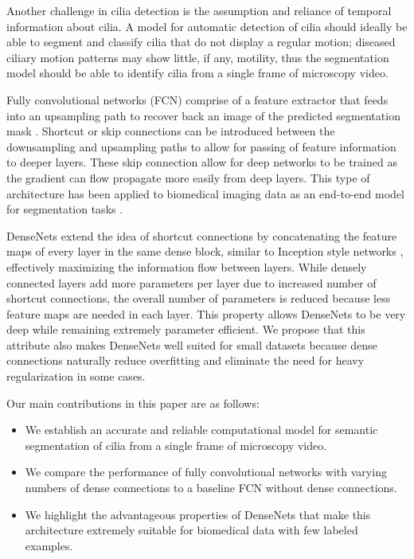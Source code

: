 \documentclass{llncs}
\begin{document}
\par
Another challenge in cilia detection is the assumption and reliance of temporal information about cilia. A model for automatic detection of cilia should ideally be able to segment and classify cilia that do not display a regular motion; diseased ciliary motion patterns may show little, if any, motility, thus the segmentation model should be able to identify cilia from a single frame of microscopy video.
\par 
Fully convolutional networks (FCN) comprise of a feature extractor that feeds into an upsampling path to recover back an image of the predicted segmentation mask \cite{FCN}. Shortcut or skip connections can be introduced between the downsampling and upsampling paths to allow for passing of feature information to deeper layers. These skip connection allow for deep networks to be trained as the gradient can flow propagate more easily from deep layers. This type of architecture has been applied to biomedical imaging data as an end-to-end model for segmentation tasks \cite{U-Net}.
\par
DenseNets \cite{DenseNet} extend the idea of shortcut connections by concatenating the feature maps of every layer in the same dense block, similar to Inception style networks \cite{Inception}, effectively maximizing the information flow between layers. While densely connected layers add more parameters per layer due to increased number of shortcut connections, the overall number of parameters is reduced because less feature maps are needed in each layer. This property allows DenseNets to be very deep while remaining extremely parameter efficient. We propose that this attribute also makes DenseNets well suited for small datasets because dense connections naturally reduce overfitting and eliminate the need for heavy regularization in some cases.    
\par
Our main contributions in this paper are as follows:
\begin{itemize}
\item We establish an accurate and reliable computational model for semantic segmentation of cilia from a single frame of microscopy video.
\item We compare the performance of fully convolutional networks with varying numbers of dense connections to a baseline FCN without dense connections. 
\item We highlight the advantageous properties of DenseNets that make this architecture extremely suitable for biomedical data with few labeled examples.  
\end{itemize}
\end{document}
